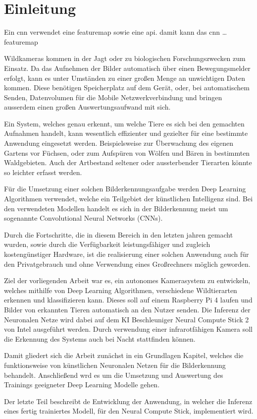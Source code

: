 \chapter{Einleitung}\label{kap:einleitung}

Ein \Gls{cnn} verwendet eine \Gls{featuremap} sowie 
eine \Gls{api}. damit kann das \Gls{cnn} \dots \Gls{featuremap}



Wildkameras kommen in der Jagt oder zu biologischen 
Forschungszwecken zum Einsatz.
Da das Aufnehmen der Bilder automatisch über einen 
Bewegungsmelder erfolgt, kann es unter Umständen zu 
einer großen Menge an unwichtigen Daten kommen.
Diese benötigen Speicherplatz auf dem Gerät, 
oder, bei automatischem Senden, Datenvolumen 
für die Mobile Netzwerkverbindung und bringen ausserdem einen 
großen Auswertungsaufwand mit sich.

Ein System, welches genau erkennt, um welche Tiere es
sich bei den gemachten Aufnahmen handelt, kann wesentlich 
effizienter und gezielter für eine bestimmte Anwendung 
eingesetzt werden.
Beispielsweise zur Überwachung des eigenen Gartens vor 
Füchsen, oder zum Aufspüren von Wölfen und Bären 
in bestimmten Waldgebieten.
Auch der Artbestand seltener oder aussterbender 
Tierarten könnte so leichter erfasst werden.

Für die Umsetzung einer solchen Bilderkennungsaufgabe 
werden Deep Learning Algorithmen verwendet, welche ein
Teilgebiet der künstlichen Intelligenz sind.
Bei den verwendeten Modellen handelt es sich in der Bilderkennung
meist um sogenannte Convolutional Neural Networks (CNNs).

Durch die Fortschritte, die in diesem Bereich in
den letzten jahren gemacht wurden, sowie durch 
die Verfügbarkeit leistungsfähiger und zugleich
kostengünstiger Hardware, ist die realisierung
einer solchen Anwendung auch für den Privatgebrauch
und ohne Verwendung eines Großrechners möglich geworden.


Ziel der vorliegenden Arbeit war es, ein autonomes Kamerasystem 
zu entwickeln, welches mithilfe von Deep Learning Algorithmen, 
verschiedene Wildtierarten erkennen und klassifizieren kann.
Dieses soll auf einem Raspberry Pi 4 laufen und 
Bilder von erkannten Tieren automatisch an den Nutzer 
senden.
Die Inferenz der Neuronalen Netze wird dabei
auf dem KI Beschleuniger Neural Compute Stick 2
von Intel ausgeführt werden. Durch verwendung einer 
infrarotfähigen Kamera soll die Erkennung des 
Systems auch bei Nacht stattfinden können.

Damit gliedert sich die Arbeit zunächst in ein
Grundlagen Kapitel, welches die funktionsweise 
von künstlichen Neuronalen Netzen für die
Bilderkennung behandelt.
Anschließend wrd es um die Umsetzung und Auswertung des 
Trainings geeigneter Deep Learning Modelle gehen.

Der letzte Teil beschreibt de Entwicklung der Anwendung, 
in welcher die Inferenz eines fertig trainiertes Modell, 
für den Neural Compute Stick, implementiert wird.